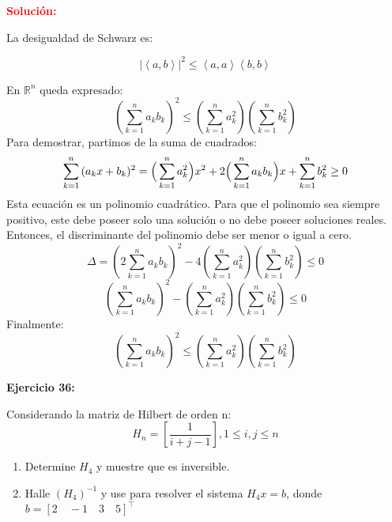 \documentclass[12pt]{article}
\begin{document}
\noindent \textcolor{red}{\bf Solución:}

La desigualdad de Schwarz es:

\begin{equation}
    \left |\left \langle a,b \right \rangle  \right |^2 \leq \left \langle a,a \right \rangle \left \langle b,b \right \rangle
\end{equation}

En $\mathbb{R}^n$ queda expresado:
\begin{equation}
    \left(\sum _{k=1}^{n}{a_{k}b_{k}}\right)^{2}\leq \left(\sum _{k=1}^{n}{a_{k}^{2}}\right)\left(\sum _{k=1}^{n}{b_{k}^{2}}\right)
\end{equation}
Para demostrar, partimos de la suma de cuadrados:
\begin{equation}
    \sum _{k=1}^{n}{(a_{k}x+b_{k})^{2}}={\Bigl (}\sum _{k=1}^{n}{a_{k}^{2}}{\Bigr )}x^{2}+2{\Bigl (}\sum _{k=1}^{n}{a_{k}b_{k}}{\Bigr )}x+\sum _{k=1}^{n}{b_{k}^{2}}\geq 0
\end{equation}
Esta ecuación es un polinomio cuadrático. Para que el polinomio sea siempre positivo, este debe poseer solo una solución o no debe poseer soluciones reales. Entonces, el discriminante del polinomio debe ser menor o igual a cero.
\begin{equation}
    \Delta =\left(2 \sum _{k=1}^{n}{a_{k}b_{k}} \right)^2 - 4\left( \sum _{k=1}^{n}{a_{k}^{2}} \right)\left( \sum _{k=1}^{n}{b_{k}^{2}} \right)\leq 0
\end{equation}
\begin{equation}
    \left(\sum _{k=1}^{n}{a_{k}b_{k}} \right)^2 - \left( \sum _{k=1}^{n}{a_{k}^{2}} \right)\left( \sum _{k=1}^{n}{b_{k}^{2}} \right)\leq 0
\end{equation}
Finalmente:
\begin{equation}
    \left(\sum _{k=1}^{n}{a_{k}b_{k}} \right)^2 \leq \left( \sum _{k=1}^{n}{a_{k}^{2}} \right)\left( \sum _{k=1}^{n}{b_{k}^{2}} \right) 
\end{equation}

%
\noindent \textbf{Ejercicio 36:}

Considerando la matriz de Hilbert de orden n:
$$H_n = \left [ \frac{1}{i+j-1} \right ], 1\leq i, j\leq n $$
\begin{enumerate}[label=(\alph*)]
    \item Determine $H_4$ y muestre que es inversible.
    \item Halle $(H_4)^{-1}$ y use para resolver el sistema $H_4x = b$, donde $b=[2\quad-1\quad3\quad5]^\intercal$
\end{enumerate}
\end{document}
